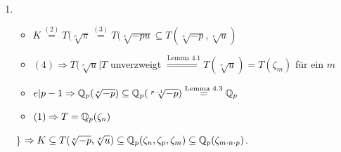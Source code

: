 \begin{enumerate}[(1)]
(B) $w(\sqrt[e]{-p})=\frac{1}{e} \Rightarrow e(\Q_p(\sqrt[e]{-p})|\Q_p) \geq e$\\
$[\Q_p(\sqrt[e]{-p}):\Q_p] = e(\Q_p(\sqrt[e]{-p}|\Q_p)=E$ und die Körpererweiterung ist total verzweigt.\\
(A)+(B) $\Rightarrow \Q_p(\zeta_e)=\Q_p \Rightarrow e$ teilt $p-1$.
\item \begin{itemize}
\item $K\stackrel{(2)}{=} T(\sqrt[e]{\pi} \stackrel{(3)}{=} T(\sqrt[e]{-pu} \subseteq T(\sqrt[e]{-p}, \sqrt[e]{u})$
\item $(4) \Rightarrow T(\sqrt[e]{u}|T$ unverzweigt $\stackrel{\text{Lemma 4.1}}{\Longrightarrow} T(\sqrt[e]{u})=T(\zeta_m)$ für ein $m$
\item $e|p-1 \Rightarrow \mathbb{Q}_p(\sqrt[e]{-p}) \subseteq \mathbb{Q}_p(\sqrt[p-1]{-p})\stackrel{\text{Lemma 4.3}}{=} \mathbb{Q}_p$
\item $(1) \Rightarrow T=\mathbb{Q}_p(\zeta_n)$
\end{itemize}
\} $\Rightarrow K \subseteq T(\sqrt[e]{-p}, \sqrt[e]{u}) \subseteq \mathbb{Q}_p(\zeta_n, \zeta_p, \zeta_m) \subseteq \mathbb{Q}_p(\zeta_{m\cdot n \cdot p})$.
\end{enumerate}
